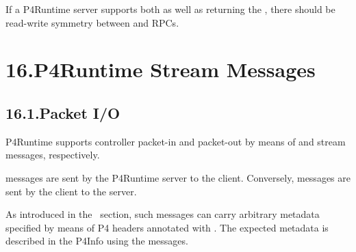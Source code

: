 \documentclass[11pt]{article}
\begin{document}
{%
If a P4Runtime server supports both  as well as
returning the , there should be read-write symmetry between
 and  RPCs.%

\section{16.\hspace*{0.5em}P4Runtime Stream Messages}\label{sec-p4runtime-stream-messages}%

\subsection{16.1.\hspace*{0.5em}Packet I/O}\label{sec-packet-i_o}%

\noindent{}P4Runtime supports controller packet-in and packet-out by means of 
and  stream messages, respectively.%

 messages are sent by the P4Runtime server to the client. Conversely,
 messages are sent by the client to the server.%

As introduced in the~
section, such messages can carry arbitrary metadata specified by means of P4
headers annotated with . The expected metadata is described
in the P4Info using the  messages.%

}
\end{document}
